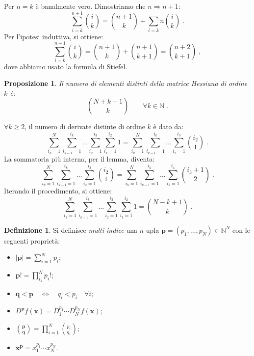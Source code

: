 \documentclass[a4paper,12pt]{report}
\theoremstyle{plain}
\newtheorem{prop}{Proposizione}[section]
\theoremstyle{definition}
\newtheorem{defn}{Definizione}[section]
\theoremstyle{remark}
\numberwithin{equation}{section}
\begin{document}
Per $n=k$ è banalmente vero. Dimostriamo che $n \Longrightarrow n+1$:
\begin{equation}
\sum_{i=k}^{n+1} \binom{i}{k}= \binom{n+1}{k}+\sum_{i=k}{n} \binom{i}{k}\;.
\end{equation}
Per l'ipotesi induttiva, si ottiene:
\begin{equation}
\sum_{i=k}^{n+1}\binom{i}{k}=\binom{n+1}{k}+\binom{n+1}{k+1}=\binom{n+2}{k+1}\;,
\end{equation}
dove abbiamo usato la formula di Stiefel.
\endproof
\begin{prop} Il numero di elementi distinti della matrice Hessiana di ordine $k$ è:
\begin{equation}
\binom{N+k-1}{k} \qquad \forall k \in \mathbb{N}\;.
\end{equation}
\end{prop}
\proof $\forall k \ge 2$, il numero di derivate distinte di ordine $k$ è dato da:
\begin{equation}
\sum_{i_k=1}^N \sum_{i_{k-1}=1}^{i_k} \ldots \sum_{i_2=1}^{i_3}\sum_{i_1=1}^{i_2} 1 = \sum_{i_k=1}^N \sum_{i_{k-1}=1}^{i_k} \ldots
 \sum_{i_2=1}^{i_3} \binom{i_2}{1}\;.
\end{equation}
La sommatoria più interna, per il lemma, diventa:
\begin{equation}
\sum_{i_k=1}^N\sum_{i_{k-1}=1}^{i_k}\ldots\sum_{i_2=1}^{i_3}\binom{i_2}{1}=\sum_{i_k=1}^N \sum_{i_{k-1}=1}^{i_k} \ldots \sum_{i_3=1}^{i_4} \binom{i_3+1}{2}\;.
\end{equation}
Iterando il procedimento, si ottiene:
\begin{equation}
\sum_{i_k=1}^N\sum_{i_{k-1}=1}^{i_k}\ldots\sum_{i_2=1}^{i_3}\sum_{i_1=1}^{i_2}1=\binom{N-k+1}{k}\;.
\end{equation}
\endproof
\begin{defn} Si definisce \textit{multi-indice} una $n$-upla $\mathbf{p}=(p_1,\ldots,p_N) \in \mathbb{N}^N$ con le seguenti proprietà:
\begin{itemize}
 \item $|\mathbf{p}|=\displaystyle{\sum_{i=1}^N p_i}$;
 \item $\mathbf{p}!=\displaystyle{\prod_{i_1}^N p_i!}$;
 \item $\mathbf{q}<\mathbf{p}\quad  \Longleftrightarrow \quad q_i<p_i \quad \forall i$;
 \item $D^{\mathbf{p}}f(\mathbf{x})=D_1^{p_1}\cdots D_N^{p_N}f(\mathbf{x})$;
 \item $\displaystyle{\binom{\mathbf{p}}{\mathbf{q}}=\prod_{i=1}^N \binom{p_i}{q_i}}$;
 \item $\mathbf{x}^{\mathbf{p}}=x_1^{p_1}\cdots x_N^{p_N}$.
\end{itemize}
\end{defn}
\end{document}
